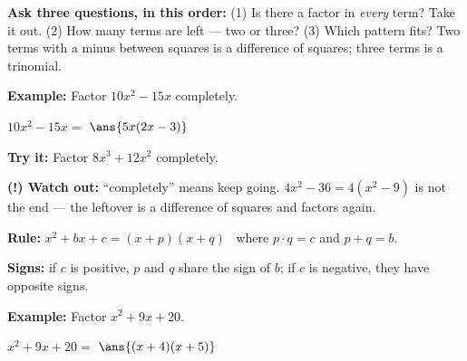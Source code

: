 \documentclass[12pt]{article}
\begin{document}


\begin{formulabox}
\textbf{Ask three questions, in this order:} (1) Is there a factor in \emph{every} term? Take it out. (2) How many terms are left --- two or three? (3) Which pattern fits? Two terms with a minus between squares is a difference of squares; three terms is a trinomial.
\end{formulabox}

\begin{examplebox}
\textbf{Example:} \quad Factor $10x^2 - 15x$ completely.
\par
$10x^2 - 15x = $ $\ans{5x(2x-3)}$
\end{examplebox}

\begin{tryitbox}
\textbf{Try it:} \quad Factor $8x^3 + 12x^2$ completely.\\[2pt]
\end{tryitbox}

\begin{watchoutbox}
\textbf{(!) Watch out:} ``completely'' means keep going. $4x^2 - 36 = 4(x^2-9)$ is not the end --- the leftover is a difference of squares and factors again.
\end{watchoutbox}


\begin{formulabox}
\textbf{Rule:} \quad $x^2 + bx + c = (x+p)(x+q)$ \ where $p \cdot q = c$ and $p + q = b$.\par\smallskip
\textbf{Signs:} if $c$ is positive, $p$ and $q$ share the sign of $b$; if $c$ is negative, they have opposite signs.
\end{formulabox}

\begin{examplebox}
\textbf{Example:} \quad Factor $x^2 + 9x + 20$.
\par
$x^2 + 9x + 20 = $ $\ans{(x+4)(x+5)}$
\end{examplebox}
\end{document}
